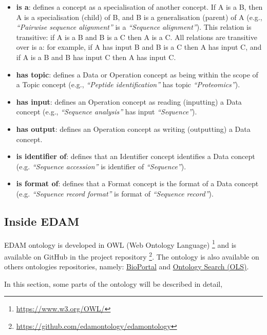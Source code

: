 \documentclass{scrartcl}
\begin{document}
\begin{itemize}
  \item \textbf{is a}: defines a concept as a specialisation of 
    another concept. If A is a B, then A is a specialisation (child) 
    of B, and B is a generalisation (parent) of A (e.g., 
    \textit{“Pairwise sequence alignment”} is a \textit{“Sequence alignment”}).
    This relation is transitive: if A is a B and B is a C then A is a C.
    All relations are transitive over is a: for example, if A 
    has input B and B is a C then A has input C, 
    and if A is a B and B has input C then A has input C.
  \item \textbf{has topic}: defines a Data or Operation concept as being 
    within the scope of a Topic concept (e.g., \textit{“Peptide identification”}
    has topic \textit{“Proteomics”}).
  \item \textbf{has input}: defines an Operation concept as reading (inputting) 
    a Data concept (e.g., \textit{“Sequence analysis”} has input 
    \textit{“Sequence”}).
  \item \textbf{has output}: defines an Operation concept as writing (outputting) 
    a Data concept.
  \item \textbf{is identifier of}: defines that an Identifier concept identifies 
    a Data concept (e.g. \textit{“Sequence accession”} 
    is identifier of \textit{“Sequence”}).
  \item \textbf{is format of}: defines that a Format concept is the format of a 
    Data concept (e.g. \textit{“Sequence record format”} is format 
    of \textit{“Sequence record”}).
\end{itemize}

\subsection{Inside EDAM}

EDAM ontology is developed in OWL (Web Ontology Language) \footnote{\url{https://www.w3.org/OWL/}} 
  and is available on GitHub in the project repository 
  \footnote{\url{https://github.com/edamontology/edamontology}}. 
  The ontology is also available on others ontologies repositories, namely:
  \href{https://bioportal.bioontology.org/ontologies/EDAM?p=classes}{BioPortal} 
  and \href{https://www.ebi.ac.uk/ols/ontologies/edam}{Ontology Search (OLS)}.
  
In this section, some parts of the ontology will be described in detail, 
\end{document}
